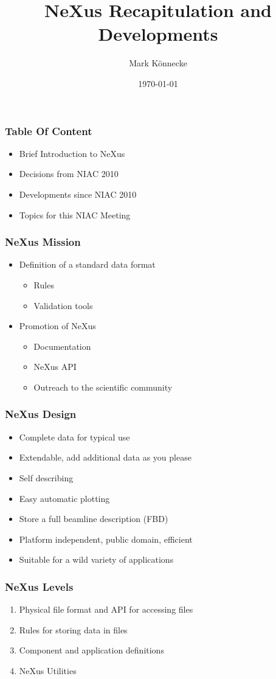 \documentclass{beamer}
\title{NeXus Recapitulation and Developments}
\author{Mark K\"onnecke }
\institute{NeXus International Advisory Committee}
\date{\today}
\begin{document}
\begin{frame}
\titlepage
\end{frame}

\begin{frame}
\frametitle{Table Of Content}
\begin{itemize}
\item Brief Introduction to NeXus
\item Decisions from NIAC 2010
\item Developments since NIAC 2010
\item Topics for this NIAC Meeting
\end{itemize}
\end{frame}


\begin{frame} \frametitle{NeXus Mission}
\begin{itemize}
\item Definition of a standard data format
\begin{itemize}
\item Rules
\item Validation tools
\end{itemize}
\item Promotion of NeXus
\begin{itemize}
\item Documentation
\item NeXus API
\item Outreach to the scientific community
\end{itemize}
\end{itemize}
\end{frame}

\begin{frame} \frametitle{NeXus Design}
\begin{itemize}
\item Complete data for typical use
\item Extendable, add additional data as you please
\item Self describing
\item Easy automatic plotting
\item Store a full beamline description (FBD)
\item Platform independent, public domain, efficient
\item Suitable for a wild variety of applications
\end{itemize}
\end{frame}

\begin{frame}
 \frametitle{NeXus Levels }
\begin{enumerate}
\item Physical file format and API for accessing files
\item Rules for storing data in files
\item Component and application definitions
\item NeXus Utilities
\end{enumerate}
\end{frame}
\end{document}
